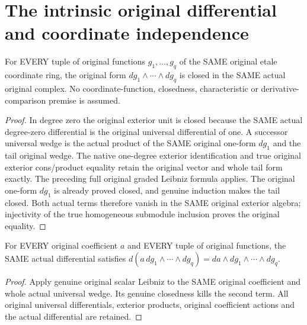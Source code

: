 \section{The intrinsic original differential and coordinate independence}
\label{sec:etale-differential-intrinsic}

\begin{theorem}
\label{lem:cartier-etale-universal-wedge-closed}
\leanok
For EVERY tuple of original functions $g_1,\ldots,g_q$ of the SAME original
etale coordinate ring, the original form $dg_1\wedge\cdots\wedge dg_q$ is
closed in the SAME actual original complex. No coordinate-function,
closedness, characteristic or derivative-comparison premise is assumed.
\end{theorem}
\begin{proof}
In degree zero the original exterior unit is closed because the SAME
actual degree-zero differential is the original universal differential of
one. A successor universal wedge is the actual product of the SAME original
one-form $dg_1$ and the tail original wedge. The native one-degree exterior
identification and true original exterior cons/product equality retain the
original vector and whole tail form exactly. The preceding full original
graded Leibniz formula applies. The original one-form $dg_1$ is already
proved closed, and genuine induction makes the tail closed. Both actual
terms therefore vanish in the SAME original exterior algebra; injectivity
of the true homogeneous submodule inclusion proves the original equality.
\end{proof}

\begin{theorem}
\label{lem:cartier-etale-intrinsic-generator-formula}
\leanok
For EVERY original coefficient $a$ and EVERY tuple of original functions,
the SAME actual differential satisfies
$d(a\,dg_1\wedge\cdots\wedge dg_q)=da\wedge dg_1\wedge\cdots\wedge dg_q$.
\end{theorem}
\begin{proof}
Apply genuine original scalar Leibniz to the SAME original coefficient and
whole actual universal wedge. Its genuine closedness kills the second
term. All original universal differentials, exterior products, original
coefficient actions and the actual differential are retained.
\end{proof}


